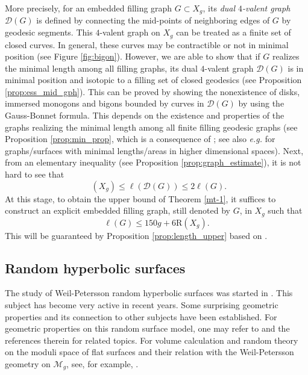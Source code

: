 \documentclass[UTF8]{amsart}
\numberwithin{equation}{section}
\theoremstyle{definition}
\theoremstyle{example}
\theoremstyle{remark}
\DeclareMathOperator{\slfs}{\mathcal{L}_{sys}^{fill}}
\begin{document}
More precisely, for an embedded filling graph $G\subset X_g$, its \emph{dual $4$-valent graph $\mathcal{D}(G)$} is defined by connecting the mid-points of neighboring edges of $G$ by geodesic segments. This $4$-valent graph on $X_g$ can be treated as a finite set of closed curves. In general, these curves may be contractible or not in minimal position (see Figure \ref{fig:bigon}). However, we are able to show that if $G$ realizes the minimal length among all filling graphs, its dual $4$-valent graph $\mathcal{D}(G)$ is in minimal position and isotopic to a filling set of closed geodesics (see Proposition \ref{prop:ess_mid_gph}). This can be proved by showing the nonexistence of disks, immersed monogons and bigons bounded by curves in $\mathcal{D}(G)$ by using the Gauss-Bonnet formula. 
This depends on the existence and properties of the graphs realizing the minimal length among all finite filling geodesic graphs (see Proposition \ref{prop:min_prop}, which is a consequence of \cite[Theorem 1.2(3)]{martelli2015spines}; see also \emph{e.g.} \cite{meeks1982embedded, white10injectivity, namazi2009heegaard} for graphs/surfaces with minimal lengths/areas in higher dimensional spaces). 
Next, from an elementary inequality (see Proposition \ref{prop:graph_estimate}), it is not hard to see that
\[\slfs(X_g)\leq \ell(\mathcal{D}(G))\leq 2 \ell(G).\]
At this stage, to obtain the upper bound of Theorem \ref{mt-1}, it suffices to construct an explicit embedded filling graph, still denoted by $G$, in $X_g$ such that
\[\ell(G)\leq 150 g+6\mathrm{R}(X_g).\]
This will be guaranteed by Proposition \ref{prop:length_upper} based on \cite[Theorem 4.5.2]{buser2010geometry}. 
\subsection{Random hyperbolic surfaces}
The study of Weil-Petersson random hyperbolic surfaces was started in \cite{Mirz10, guth2011pants, mirzakhani2013growth}. This subject has become very active in recent years. Some surprising geometric properties and its connection to other subjects have been established. For geometric properties on this random surface model, one may refer to \cite{guth2011pants, mirzakhani2013growth, mirzakhani2019lengths, PWX22, MT22, nie2023large, dozier2023counting, he2023non, wu2025prime} and the references therein for related topics. For volume calculation and random theory on the moduli space of flat surfaces and their relation with the Weil-Petersson geometry on $\mathcal{M}_g$, see, for example, \cite{MZ15, aggarwal2020large, masur2024lengths}. 
\end{document}
